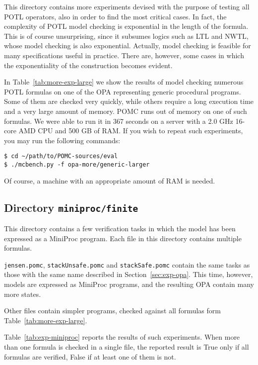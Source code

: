 \documentclass[9pt,a4paper]{article}
\begin{document}
This directory contains more experiments devised with the purpose of
testing all POTL operators, also in order to find the most critical
cases.  In fact, the complexity of POTL model checking is exponential
in the length of the formula.  This is of course unsurprising, since
it subsumes logics such as LTL and NWTL, whose model checking is also
exponential.  Actually, model checking is feasible for many
specifications useful in practice.  There are, however, some cases in
which the exponentiality of the construction becomes evident.

In Table~\ref{tab:more-exp-large} we show the results of model checking numerous
POTL formulas on one of the OPA representing generic procedural programs.
Some of them are checked very quickly,
while others require a long execution time and a very large amount of
memory. POMC runs out of memory on one of such formulas.
We were able to run it in 367 seconds on a server with
a 2.0 GHz 16-core AMD CPU and 500 GB of RAM.
If you wish to repeat such experiments, you may run the following
commands:
\begin{verbatim}
$ cd ~/path/to/POMC-sources/eval
$ ./mcbench.py -f opa-more/generic-larger
\end{verbatim}
Of course, a machine with an appropriate amount of RAM is needed.


\subsection{Directory \texttt{miniproc/finite}}

This directory contains a few verification tasks in which the model
has been expressed as a MiniProc program.
Each file in this directory contains multiple formulas.

\texttt{jensen.pomc}, \texttt{stackUnsafe.pomc} and \texttt{stackSafe.pomc}
contain the same tasks as those with the same name described in Section~\ref{sec:exp-opa}.
This time, however, models are expressed as MiniProc programs, and the resulting
OPA contain many more states.

Other files contain simpler programs, checked against all formulas form
Table~\ref{tab:more-exp-large}.

Table~\ref{tab:exp-miniproc} reports the results of such experiments.
When more than one formula is checked in a single file, the reported result is True
only if all formulas are verified, False if at least one of them is not.
\end{document}

